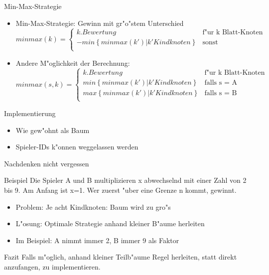 \documentclass[18pt]{beamer}
\begin{document}
\begin{frame}{Min-Max-Strategie}
\begin{itemize}
\item Min-Max-Strategie: Gewinn mit gr"o"stem Unterschied
\begin{equation}
   minmax(k) =
   \begin{cases}
     k.Bewertung & \text{f"ur k Blatt-Knoten} \\
     - min\left\{minmax(k') | k' Kindknoten\right\} & \text{sonst} \\
   \end{cases}
\end{equation}
\item Andere M"oglichkeit der Berechnung:
\begin{equation}
   minmax(s,k) =
   \begin{cases}
     k.Bewertung & \text{f"ur k Blatt-Knoten} \\
     min\left\{minmax(k') | k' Kindknoten\right\} & \text{falls s = A} \\
     max\left\{minmax(k') | k' Kindknoten\right\} & \text{falls s = B} \\
   \end{cases}
\end{equation}
\end{itemize}
\end{frame}

\begin{frame}{Implementierung}
\begin{itemize}
\item Wie gew"ohnt als Baum

\item Spieler-IDs k"onnen weggelassen werden

\end{itemize}
\end{frame}

\begin{frame}{Nachdenken nicht vergessen}
\begin{block}{Beispiel}
Die Spieler A und B multiplizieren x abwechselnd mit einer Zahl von 2 bis 9. Am Anfang ist x=1. Wer zuerst "uber eine Grenze n kommt, gewinnt.
\end{block}
\pause
\begin{itemize}
\item Problem: Je acht Kindknoten: Baum wird zu gro"s
\item L"osung: Optimale Strategie anhand kleiner B"aume herleiten
\item Im Beispiel: A nimmt immer 2, B immer 9 als Faktor
\end{itemize}
\pause
\begin{block}{Fazit}
Falls m"oglich, anhand kleiner Teilb"aume Regel herleiten, statt direkt anzufangen, zu implementieren.
\end{block}
\end{frame}
\end{document}
